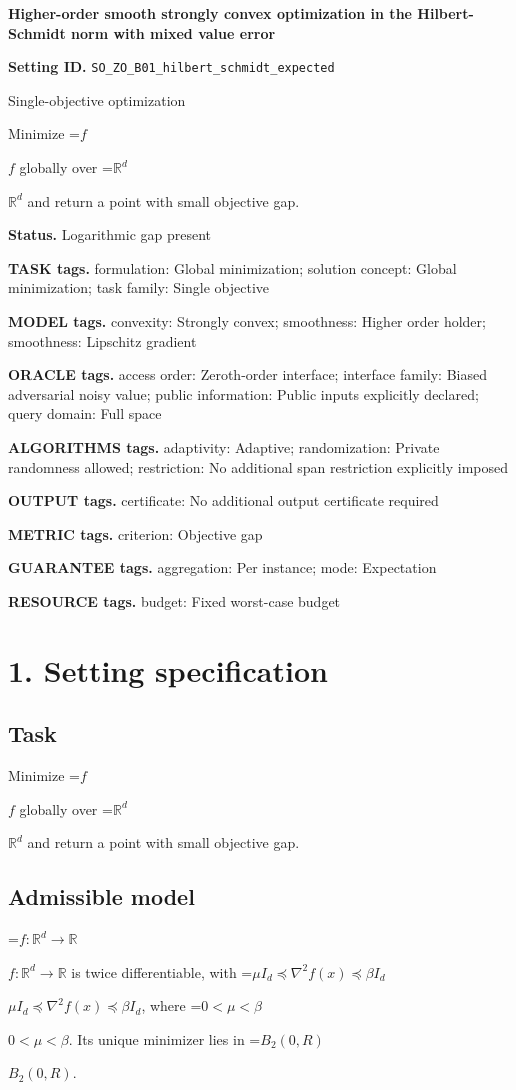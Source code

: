 \documentclass[10pt,a4paper]{article}
\newcommand{\AtlasMath}[1]{\par\begingroup\centering\setbox0=\hbox{$\displaystyle #1$}\ifdim\wd0>1.4\linewidth\typeout{ATLAS WIDE FORMULA: \the\wd0}\fi\ifdim\wd0>\linewidth\resizebox{\linewidth}{!}{\box0}\else\box0\fi\par\endgroup}
\newcommand{\AtlasInlineMath}[1]{\begingroup\setbox0=\hbox{$#1$}\ifdim\wd0>.4\linewidth\endgroup\AtlasMath{#1}\else\endgroup$#1$\fi}
\begin{document}
\raggedright

{\LARGE\bfseries\sffamily\color{AtlasNavy} Higher-order smooth strongly convex optimization in the Hilbert-Schmidt norm with mixed value error\par}\vspace{5pt}
\textbf{Setting ID.} \texttt{SO\_\allowbreak{}ZO\_\allowbreak{}B01\_\allowbreak{}hilbert\_\allowbreak{}schmidt\_\allowbreak{}expected}

Single-objective optimization

Minimize \AtlasInlineMath{f} globally over \AtlasInlineMath{\mathbb{R}^d} and return a point with small objective gap.

\textbf{Status.} Logarithmic gap present

\textbf{TASK tags.} formulation: Global minimization; solution concept: Global minimization; task family: Single objective

\textbf{MODEL tags.} convexity: Strongly convex; smoothness: Higher order holder; smoothness: Lipschitz gradient

\textbf{ORACLE tags.} access order: Zeroth-order interface; interface family: Biased adversarial noisy value; public information: Public inputs explicitly declared; query domain: Full space

\textbf{ALGORITHMS tags.} adaptivity: Adaptive; randomization: Private randomness allowed; restriction: No additional span restriction explicitly imposed

\textbf{OUTPUT tags.} certificate: No additional output certificate required

\textbf{METRIC tags.} criterion: Objective gap

\textbf{GUARANTEE tags.} aggregation: Per instance; mode: Expectation

\textbf{RESOURCE tags.} budget: Fixed worst-case budget

\section{1. Setting specification}
\subsection{Task}
Minimize \AtlasInlineMath{f} globally over \AtlasInlineMath{\mathbb{R}^d} and return a point with small objective gap.

\subsection{Admissible model}
\AtlasInlineMath{f:\mathbb{R}^d\to\mathbb{R}} is twice differentiable, with \AtlasInlineMath{\mu I_d\preceq\nabla^2f(x)\preceq\beta I_d}, where \AtlasInlineMath{0<\mu<\beta}. Its unique minimizer lies in \AtlasInlineMath{B_2(0,R)}.
\end{document}
